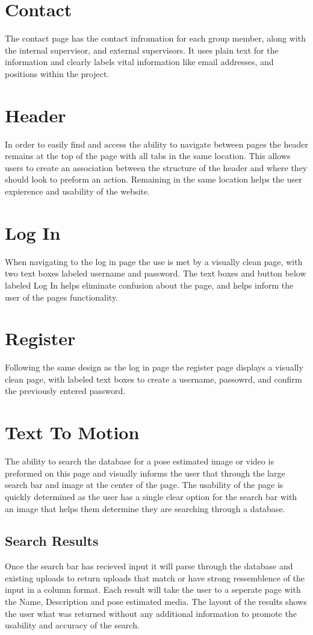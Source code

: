 \documentclass{scrreprt}
\begin{document}
\section{Contact}
The contact page has the contact infromation for each group member, along with the internal supervisor, and external supervisors. It uses plain text for the information and clearly labels vital information like email addresses, and positions within the project.

\section{Header}
In order to easily find and access the ability to navigate between pages the header remains at the top of the page with all tabs in the same location. This allows users to create an association between the structure of the header and where they should look to preform an action. Remaining in the same location helps the user expierence and usability of the website.

\section{Log In}
When navigating to the log in page the use is met by a visually clean page, with two text boxes labeled username and password. The text boxes and button below labeled Log In helps eliminate confusion about the page, and helps inform the user of the pages functionality.

\section{Register}
Following the same design as the log in page the register page displays a visually clean page, with labeled text boxes to create a username, passowrd, and confirm the previously entered password.

\section{Text To Motion}
The ability to search the database for a pose estimated image or video is preformed on this page and visually informs the user that through the large search bar and image at the center of the page. The usability of the page is quickly determined as the user has a single clear option for the search bar with an image that helps them determine they are searching through a database.

\subsection{Search Results}
Once the search bar has recieved input it will parse through the database and existing uploads to return uploads that match or have strong ressemblence of the input in a column format. Each result will take the user to a seperate page with the Name, Description and pose estimated media. The layout of the results shows the user what was returned without any additional information to promote the usability and accuracy of the search.
\end{document}
